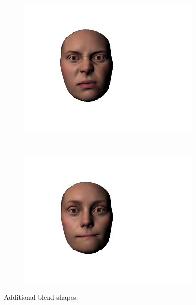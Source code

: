 \documentclass[11pt]{report}
\begin{document}
\begin{figure}[htbp!]
        \begin{subfigure}[b]{0.23\textwidth}
                \includegraphics[trim = 50mm 30mm 80mm 30mm,clip,width=\textwidth]{img/weights/3D/Extrafaces/nosewrinkle2.png}
        \end{subfigure}
        ~ %
        \begin{subfigure}[b]{0.23\textwidth}
                \includegraphics[trim = 50mm 30mm 80mm 30mm,clip,width=\textwidth]{img/weights/3D/Extrafaces/mouthsuck.png}
        \end{subfigure}
        \caption{Additional blend shapes. }\label{fig:extrafaces}
\end{figure}
\end{document}
